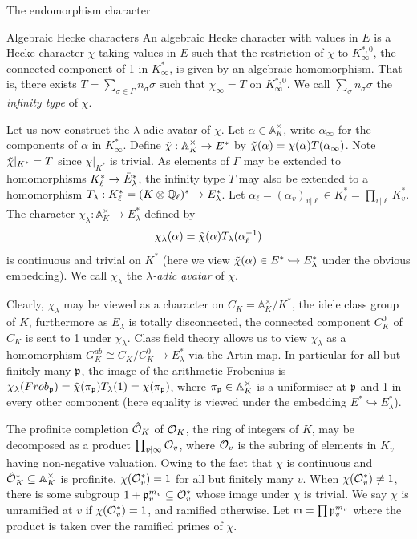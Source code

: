 \documentclass[11pt,a4paper]{article}
\begin{document}
\begin{section}{The endomorphism character}
\begin{subsection}{Algebraic Hecke characters}
An algebraic Hecke character with values in $E$ is a Hecke character $\chi$ taking values in $E$ such that the restriction of $\chi$ to $K_\infty^{*, 0}$, the connected component of 1 in $K_\infty^*$, is given by an algebraic homomorphism. That is, there exists $T = \sum_{\sigma \in \Gamma} n_\sigma \sigma $ such that $\chi_\infty = T$ on $K_\infty^{*, 0}$. We call $\sum_\sigma n_\sigma \sigma$ the \emph{infinity type} of $\chi$.

Let us now construct the $\lambda$-adic avatar of $\chi$.
Let $\alpha \in \mathbb{A}_K^\times$, write $\alpha_\infty$ for the components of $\alpha$ in $K^*_\infty$.
Define $\Tilde{\chi}: \mathbb{A}_K^\times \rightarrow E^*$ by $ \Tilde{\chi}(\alpha) = \chi(\alpha) T(\alpha_\infty) $. Note $\Tilde{\chi}|_{K^*} = T$ since ${\chi}|_{K^*}$ is trivial. %
As elements of $\Gamma$ may be extended to homomorphisms $K_\ell^* \rightarrow \Bar{E}_\lambda^*$, the infinity type $T$ may also be extended to a homomorphism $T_\lambda:K_\ell^* = (K\otimes \mathbb{Q}_\ell)^* \rightarrow E_\lambda^*$.
Let $\alpha_\ell = (\alpha_v)_{v|\ell} \in K_\ell^* = \prod_{v|\ell} K_v^*$.
The character $\chi_\lambda:\mathbb{A}_K^\times \rightarrow E_\lambda^*$ defined by $$ \chi_\lambda(\alpha) = \Tilde{\chi}(\alpha)T_\lambda(\alpha_\ell^{-1})$$
is continuous and trivial on $K^*$ (here we view $\Tilde{\chi}(\alpha)\in E^* \hookrightarrow E^*_\lambda$ under the obvious embedding).
We call $\chi_\lambda$ the \emph{$\lambda$-adic avatar} of $\chi$.

Clearly, $\chi_\lambda$ may be viewed as a character on $C_K = \mathbb{A}_K^\times/K^*$, the idele class group of $K$, furthermore as $E_\lambda$ is totally disconnected, the connected component $C_K^0$ of $C_K$ is sent to 1 under $\chi_\lambda$. Class field theory allows us to view $\chi_\lambda$ as a homomorphism $G_K^{ab} \cong C_K/C^0_K \rightarrow E_\lambda^*$ via the Artin map. In particular for all but finitely many $\mathfrak{p}$, the image of the arithmetic Frobenius is $\chi_\lambda(\Frob_\p) = \Tilde{\chi}(\pi_\p)T_\lambda(1) = \chi(\pi_\p)$, where $\pi_{\mathfrak{p}} \in \mathbb{A}_K^\times$ is a uniformiser at $\mathfrak{p}$ and 1 in every other component (here equality is viewed under the embedding $E^* \hookrightarrow E^*_\lambda$).


The profinite completion $\hat{\mathcal{O}}_K$ of $\mathcal{O}_K$, the ring of integers of $K$, may be decomposed as a product $\prod_{v \nmid \infty}\mathcal{O}_v$, where $\mathcal{O}_v$ is the subring of elements in $K_v$ having non-negative valuation.
Owing to the fact that $\chi$ is continuous and $\hat{\mathcal{O}}_K^* \subseteq \mathbb{A}_K^\times$ is profinite, $\chi(\mathcal{O}_v^*)=1$ for all but finitely many $v$. When $\chi(\mathcal{O}_v^*)\neq1$, there is some subgroup $1+\mathfrak{p}_v^{m_v} \subseteq \mathcal{O}_v^*$ whose image under $\chi$ is trivial.
We say $\chi$ is unramified at $v$ if $\chi(\mathcal{O}_v^*)=1$, and ramified otherwise.
Let $\mathfrak{m} =\prod \mathfrak{p}_v^{m_v} $ where the product is taken over the ramified primes of $\chi$.


\end{subsection}
\end{section}
\end{document}
